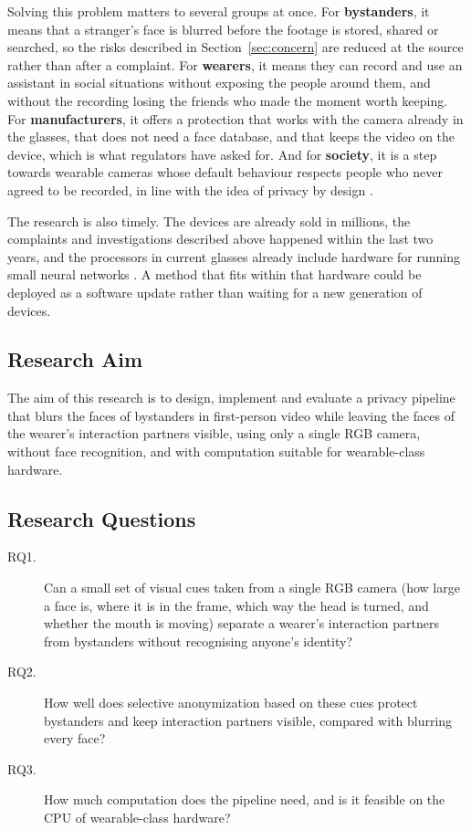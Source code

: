 Solving this problem matters to several groups at once. For \textbf{bystanders}, it means
that a stranger's face is blurred before the footage is stored, shared or searched, so the
risks described in Section~\ref{sec:concern} are reduced at the source rather than after a
complaint. For \textbf{wearers}, it means they can record and use an assistant in social
situations without exposing the people around them, and without the recording losing the
friends who made the moment worth keeping. For \textbf{manufacturers}, it offers a
protection that works with the camera already in the glasses, that does not need a face
database, and that keeps the video on the device, which is what regulators have asked for.
And for \textbf{society}, it is a step towards wearable cameras whose default behaviour
respects people who never agreed to be recorded, in line with the idea of privacy by
design \cite{cavoukian2009pbd}.

The research is also timely. The devices are already sold in millions, the complaints and
investigations described above happened within the last two years, and the processors in
current glasses already include hardware for running small neural networks
\cite{qcom_ar1}. A method that
fits within that hardware could be deployed as a software update rather than waiting for a
new generation of devices.

\subsection{Research Aim}

The aim of this research is to design, implement and evaluate a privacy pipeline that
blurs the faces of bystanders in first-person video while leaving the faces of the
wearer's interaction partners visible, using only a single RGB camera, without face
recognition, and with computation suitable for wearable-class hardware.

\subsection{Research Questions}
\label{sec:rq}

\begin{description}
  \item[RQ1.] Can a small set of visual cues taken from a single RGB camera (how large a
        face is, where it is in the frame, which way the head is turned, and whether the
        mouth is moving) separate a wearer's interaction partners from bystanders without
        recognising anyone's identity?
  \item[RQ2.] How well does selective anonymization based on these cues protect bystanders
        and keep interaction partners visible, compared with blurring every face?
  \item[RQ3.] How much computation does the pipeline need, and is it feasible on the CPU of
        wearable-class hardware?
\end{description}

